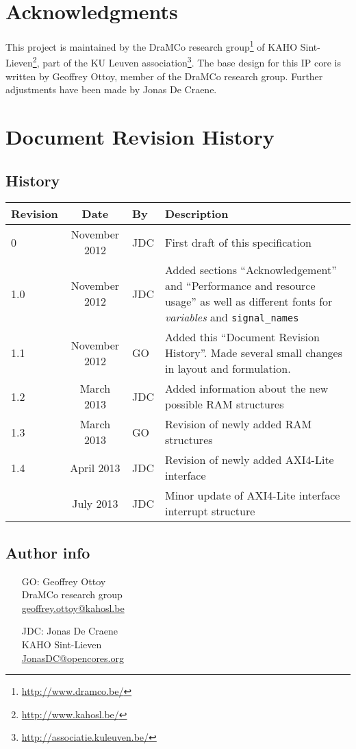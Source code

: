 \chapter*{Acknowledgments}
This project is maintained by the DraMCo research group\footnote{\url{http://www.dramco.be/}} of KAHO Sint-Lieven\footnote{\url{http://www.kahosl.be/}}, part of the KU Leuven association\footnote{\url{http://associatie.kuleuven.be/}}.
The base design for this IP core is written by Geoffrey Ottoy, member of the DraMCo research group. Further adjustments have been made by Jonas De Craene.


\chapter*{Document Revision History} 

\section*{History}
\begin{tabular}{|l|c|l|p{10cm}|}
	\hline
	\rowcolor{Gray}
	\textbf{Revision} & \textbf{Date} & \textbf{By} & \textbf{Description} \\
	\hline
	0	& November 2012	& JDC	& First draft of this specification\\
	\hline
	1.0 & November 2012	& JDC	& Added sections ``Acknowledgement'' and ``Performance and resource usage'' as well as different fonts for \textit{variables} and \verb|signal_names|\\
	\hline
	1.1 & November 2012	& GO	& Added this ``Document Revision History''. Made several small changes in layout and formulation.\\
	\hline
	1.2 & March 2013	& JDC	& Added information about the new possible RAM structures\\
	\hline
	1.3 & March 2013	& GO	& Revision of newly added RAM structures\\
	\hline
	1.4	& April 2013	& JDC	& Revision of newly added AXI4-Lite interface\\
	\hline
		& July 2013	& JDC	& Minor update of AXI4-Lite interface interrupt structure\\
	\hline
\end{tabular}%

\section*{Author info}

\begin{itemize}
\item[GO:] Geoffrey Ottoy\\DraMCo research group\\\url{geoffrey.ottoy@kahosl.be}
\item[JDC:] Jonas De Craene\\KAHO Sint-Lieven\\\url{JonasDC@opencores.org}
\end{itemize}
